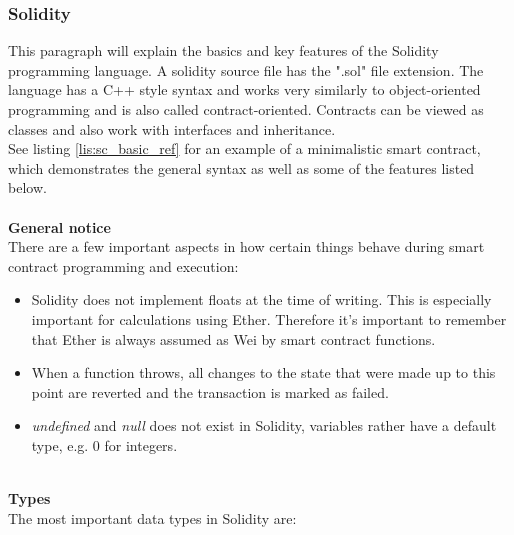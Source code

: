 \subsubsection{Solidity}
This paragraph will explain the basics and key features of the Solidity programming language.
A solidity source file has the ".sol" file extension. The language has a C++ style syntax and works very similarly to object-oriented programming and is also called contract-oriented\cite{doc-oriented}. Contracts can be viewed as classes and also work with interfaces and inheritance.
\\
See listing \ref{lis:sc_basic_ref} for an example of a minimalistic smart contract, which demonstrates the general syntax as well as some of the features listed below.
\\\\
\textbf{General notice}\\
There are a few important aspects in how certain things behave during smart contract programming and execution:
\begin{itemize}
  \item Solidity does not implement floats at the time of writing. This is especially important for calculations using Ether. Therefore it's important to remember that Ether is always assumed as Wei by smart contract functions.
  \item When a function throws, all changes to the state that were made up to this point are reverted and the transaction is marked as failed.
  \item \textit{undefined} and \textit{null} does not exist in Solidity, variables rather have a default type, e.g. 0 for integers\cite{doc-types}.
\end{itemize}
\leavevmode
\\
\textbf{Types}\\
The most important data types in Solidity are\cite{doc-types}:
